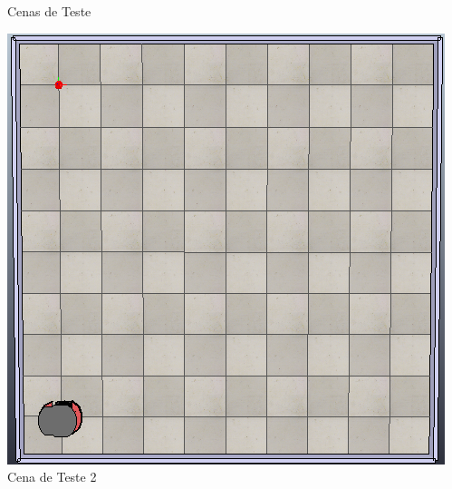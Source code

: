 \documentclass{beamer}
\begin{document}
\begin{frame}{Cenas de Teste}
\begin{minipage}{0.48\linewidth}
    \includegraphics[width=\linewidth]{Figuras/Cena_teste_2.png}
    Cena de Teste 2
  \end{minipage}
\end{frame}
\end{document}
